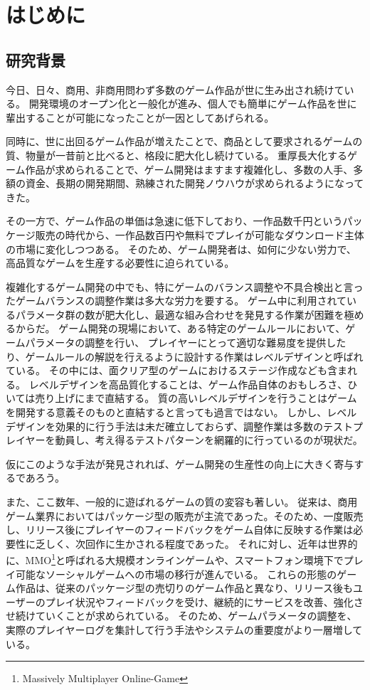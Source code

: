 \chapter{はじめに}
\section{研究背景}
今日、日々、商用、非商用問わず多数のゲーム作品が世に生み出され続けている。
開発環境のオープン化と一般化が進み、個人でも簡単にゲーム作品を世に輩出することが可能になったことが一因としてあげられる。

同時に、世に出回るゲーム作品が増えたことで、商品として要求されるゲームの質、物量が一昔前と比べると、格段に肥大化し続けている。
重厚長大化するゲーム作品が求められることで、ゲーム開発はますます複雑化し、多数の人手、多額の資金、長期の開発期間、熟練された開発ノウハウが求められるようになってきた。

その一方で、ゲーム作品の単価は急速に低下しており、一作品数千円というパッケージ販売の時代から、一作品数百円や無料でプレイが可能なダウンロード主体の市場に変化しつつある。
そのため、ゲーム開発者は、如何に少ない労力で、高品質なゲームを生産する必要性に迫られている。

複雑化するゲーム開発の中でも、特にゲームのバランス調整や不具合検出と言ったゲームバランスの調整作業は多大な労力を要する。
ゲーム中に利用されているパラメータ群の数が肥大化し、最適な組み合わせを発見する作業が困難を極めるからだ。
ゲーム開発の現場において、ある特定のゲームルールにおいて、ゲームパラメータの調整を行い、
プレイヤーにとって適切な難易度を提供したり、ゲームルールの解説を行えるように設計する作業はレベルデザインと呼ばれている。
その中には、面クリア型のゲームにおけるステージ作成なども含まれる。
レベルデザインを高品質化することは、ゲーム作品自体のおもしろさ、ひいては売り上げにまで直結する。
質の高いレベルデザインを行うことはゲームを開発する意義そのものと直結すると言っても過言ではない。
しかし、レベルデザインを効果的に行う手法は未だ確立しておらず、調整作業は多数のテストプレイヤーを動員し、考え得るテストパターンを網羅的に行っているのが現状だ。

仮にこのような手法が発見されれば、ゲーム開発の生産性の向上に大きく寄与するであろう。

また、ここ数年、一般的に遊ばれるゲームの質の変容も著しい。
従来は、商用ゲーム業界においてはパッケージ型の販売が主流であった。そのため、一度販売し、リリース後にプレイヤーのフィードバックをゲーム自体に反映する作業は必要性に乏しく、次回作に生かされる程度であった。
それに対し、近年は世界的に、MMO\footnote{Massively Multiplayer Online-Game}と呼ばれる大規模オンラインゲームや、スマートフォン環境下でプレイ可能なソーシャルゲームへの市場の移行が進んでいる。
これらの形態のゲーム作品は、従来のパッケージ型の売切りのゲーム作品と異なり、リリース後もユーザーのプレイ状況やフィードバックを受け、継続的にサービスを改善、強化させ続けていくことが求められている。
そのため、ゲームパラメータの調整を、実際のプレイヤーログを集計して行う手法やシステムの重要度がより一層増している。


